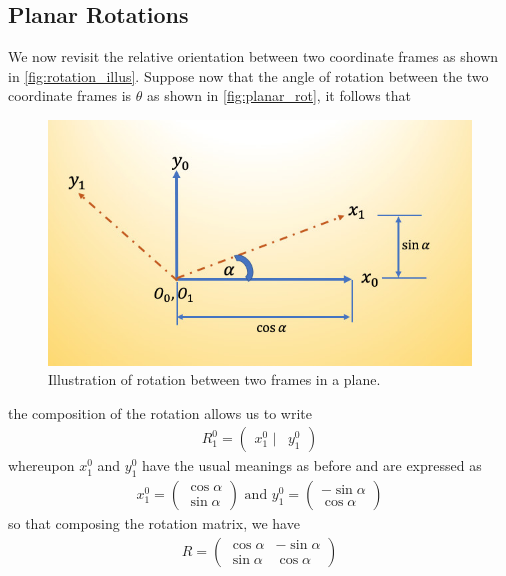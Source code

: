 \subsection{Planar Rotations}
%
We now revisit the relative orientation between two coordinate frames as shown in \autoref{fig:rotation_illus}. Suppose now that the angle of rotation between the two coordinate frames is $\theta$ as shown in \autoref{fig:planar_rot}, it follows that 
%
\begin{figure}[tb!]
	\centering
	\includegraphics[width=.75\columnwidth]{figures/planar_rot.jpg}
	\caption{Illustration of rotation between two frames in a plane.}
	\label{fig:planar_rot}
\end{figure}
%
the composition of the rotation allows us to write 
%
\begin{align}
R_1^0 = \left(\begin{array}{cc}
x_1^0 \,\,| & y_1^0
\end{array}\right)
\end{align}
%
whereupon $x_1^0$ and $y_1^0$ have the usual meanings as before and are expressed as 
%
\begin{align}
x_1^0 = \left(\begin{array}{cc}
\cos \alpha \\ \sin \alpha
\end{array}\right) \text{ and }
%
y_1^0 = \left(\begin{array}{cc}
-\sin \alpha \\ \cos \alpha
\end{array}\right)
\end{align}
%
so that composing the rotation matrix, we have
%
\begin{align}
R = \left(\begin{array}{cc}
\cos \alpha & -\sin \alpha \\ \sin \alpha &  \cos \alpha
\end{array}\right)
\end{align}
